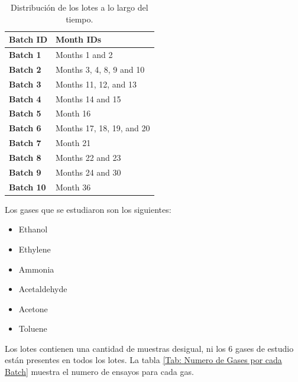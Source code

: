 \begin{table}[h!]
\begin{tabular}{>{\bfseries}l|l|}
\toprule
Batch ID & Month IDs                   \\ \midrule
Batch 1  & Months 1 and 2              \\
Batch 2  & Months 3, 4, 8, 9 and 10    \\
Batch 3  & Months 11, 12, and 13       \\
Batch 4  & Months 14 and 15            \\
Batch 5  & Month 16                    \\
Batch 6  & Months 17, 18, 19, and 20   \\
Batch 7  & Month 21                    \\
Batch 8  & Months 22 and 23            \\
Batch 9  & Months 24 and 30            \\
Batch 10 & Month 36                    \\ \bottomrule
\end{tabular}
\caption{Distribución de los lotes a lo largo del tiempo. \label{Tab: batch_month}}
\end{table}

Los gases que se estudiaron son los siguientes:
\begin{itemize}
    \item Ethanol
    \item Ethylene
    \item Ammonia
    \item Acetaldehyde
    \item Acetone
    \item Toluene
\end{itemize}

Los lotes contienen una cantidad de muestras desigual, ni los 6 gases de estudio están presentes en todos los lotes. La tabla \ref{Tab: Numero de Gases por cada Batch} muestra el numero de ensayos para cada gas.

